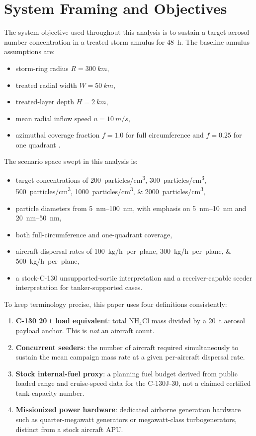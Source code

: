 \documentclass[8pt,twocolumn]{extarticle}
\begin{document}
\section*{System Framing and Objectives}

The system objective used throughout this analysis is to sustain a target aerosol number concentration in a treated storm annulus for \SI{48}{h}. The baseline annulus assumptions are:
\begin{itemize}[leftmargin=1.1em,itemsep=0.1em]
\item storm-ring radius $R = \SI{300}{km}$,
\item treated radial width $W = \SI{50}{km}$,
\item treated-layer depth $H = \SI{2}{km}$,
\item mean radial inflow speed $u = \SI{10}{m/s}$,
\item azimuthal coverage fraction $f = 1.0$ for full circumference and $f = 0.25$ for one quadrant \citep{AeolusPayloadMethods}.
\end{itemize}

\vspace{0.25em}
The scenario space swept in this analysis is:
\begin{itemize}[leftmargin=1.1em,itemsep=0.1em]
\item target concentrations of \SIlist{200;300;500;1000;2000}{particles/cm^3},
\item particle diameters from \SIrange{5}{100}{nm}, with emphasis on \SIrange{5}{10}{nm} and \SIrange{20}{50}{nm},
\item both full-circumference and one-quadrant coverage,
\item aircraft dispersal rates of \SIlist{100;300;500}{kg/h per plane},
\item a stock-C-130 unsupported-sortie interpretation and a receiver-capable seeder interpretation for tanker-supported cases.
\end{itemize}

\vspace{0.25em}
To keep terminology precise, this paper uses four definitions consistently:
\begin{enumerate}[leftmargin=1.1em,itemsep=0.1em]
\item \textbf{C-130 20 t load equivalent}: total NH$_4$Cl mass divided by a \SI{20}{t} aerosol payload anchor. This is \emph{not} an aircraft count.
\item \textbf{Concurrent seeders}: the number of aircraft required simultaneously to sustain the mean campaign mass rate at a given per-aircraft dispersal rate.
\item \textbf{Stock internal-fuel proxy}: a planning fuel budget derived from public loaded range and cruise-speed data for the C-130J-30, not a claimed certified tank-capacity number.
\item \textbf{Missionized power hardware}: dedicated airborne generation hardware such as quarter-megawatt generators or megawatt-class turbogenerators, distinct from a stock aircraft APU.
\end{enumerate}
\end{document}
